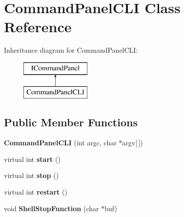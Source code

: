 \hypertarget{class_command_panel_c_l_i}{
\section{CommandPanelCLI Class Reference}
\label{class_command_panel_c_l_i}
}
Inheritance diagram for CommandPanelCLI:\begin{figure}[H]
\begin{center}
\leavevmode
\includegraphics[height=2.000000cm]{class_command_panel_c_l_i}
\end{center}
\end{figure}
\subsection*{Public Member Functions}
\begin{DoxyCompactItemize}
\item 
\hypertarget{class_command_panel_c_l_i_a6b3ca62ce3e205a2db629a8b148eb497}{
{\bfseries CommandPanelCLI} (int argc, char $\ast$argv\mbox{[}$\,$\mbox{]})}
\label{class_command_panel_c_l_i_a6b3ca62ce3e205a2db629a8b148eb497}

\item 
\hypertarget{class_command_panel_c_l_i_a23691d223437b8eff265b7e9833e6ebf}{
virtual int {\bfseries start} ()}
\label{class_command_panel_c_l_i_a23691d223437b8eff265b7e9833e6ebf}

\item 
\hypertarget{class_command_panel_c_l_i_ac16eb64c8081ca93f946f4fa27c472b4}{
virtual int {\bfseries stop} ()}
\label{class_command_panel_c_l_i_ac16eb64c8081ca93f946f4fa27c472b4}

\item 
\hypertarget{class_command_panel_c_l_i_a0cb7d4a39d25b142b066549c1f58ee2d}{
virtual int {\bfseries restart} ()}
\label{class_command_panel_c_l_i_a0cb7d4a39d25b142b066549c1f58ee2d}

\item 
\hypertarget{class_command_panel_c_l_i_aad32b43d5753c717fad2ea0e55463ec5}{
void {\bfseries ShellStopFunction} (char $\ast$buf)}
\label{class_command_panel_c_l_i_aad32b43d5753c717fad2ea0e55463ec5}

\end{DoxyCompactItemize}
